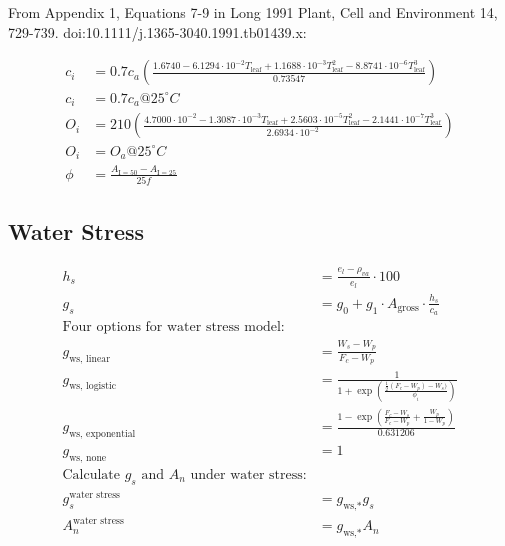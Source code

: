 \documentclass[10pt]{article}
\begin{document}
From Appendix 1, Equations 7-9 in Long 1991 Plant, Cell and Environment 14, 729-739. doi:10.1111/j.1365-3040.1991.tb01439.x:

\begin{align}
c_i &= 0.7c_a\left(\frac{1.6740-6.1294\cdot10^{-2}T_\text{leaf}+1.1688\cdot10^{-3}T_\text{leaf}^2-8.8741\cdot10^{-6}T_\text{leaf}^3}{0.73547}\right)\\
c_i&=0.7c_a @ 25^{\circ}C \\
O_i&=210\left(\frac{4.7000\cdot10^{-2}-1.3087\cdot10^{-3}T_\text{leaf}+2.5603\cdot10^{-5}T_\text{leaf}^2-2.1441\cdot10^{-7}T_\text{leaf}^3}{2.6934\cdot10^{-2}}\right)\\
O_i&=O_a  @ 25^{\circ}C\\
\phi&=\frac{A_{\text{I}=50}-A_{\text{I}=25}}{25f}
\end{align}

\subsection*{Water Stress}
\begin{align}
h_{s} &= \frac{e_{l} - \rho_{va}}{e_{l}} \cdot 100 \label{eqn:hs} \\
g_{s} &= g_{0} + g_{1} \cdot A_{\text{gross}} \cdot \frac{h_{s}}{c_{a}} \label{eqn:gs} \\
\text{Four options for water stress model:} \label{eqn:gws}\\
g_\text{ws, linear}&= \frac{W_s-W_p}{F_c-W_p}\\
g_\text{ws, logistic}&= \frac{1}{1+\exp\left(\frac{\frac{1}{2}(F_c-W_p)-W_s)}{\phi_i}\right)}\\
g_\text{ws, exponential}&= \frac{1-\exp\left(\frac{F_c-W_s}{F_c-W_p}+\frac{W_p}{1-W_p}\right)}{0.631206}\\
g_\text{ws, none}&= 1\\
\text{Calculate $g_s$ and $A_n$ under water stress:}\\
g_{s}^{\text{water stress}}&=g_\text{ws,*}g_s\\
A_{n}^{\text{water stress}}&=g_\text{ws,*}A_n
\end{align}
\end{document}
